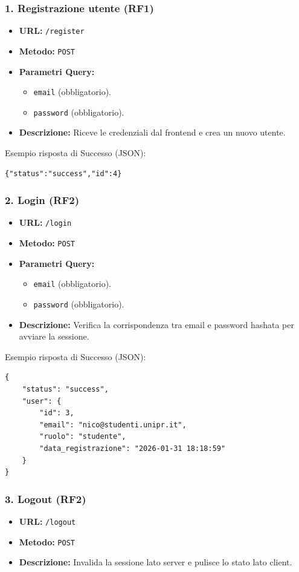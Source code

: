 \subsubsection{1. Registrazione utente (RF1)}
\begin{itemize}
    \item \textbf{URL:} \texttt{/register}
    \item \textbf{Metodo:} \texttt{POST}    
    \item \textbf{Parametri Query:} 
        \begin{itemize}
            \item \texttt{email} (obbligatorio).
            \item \texttt{password} (obbligatorio).
        \end{itemize}
    \item \textbf{Descrizione:} Riceve le credenziali dal frontend e crea un nuovo utente.
\end{itemize}
Esempio risposta di Successo (JSON):
\begin{verbatim}
{"status":"success","id":4}
\end{verbatim}

\subsubsection{2. Login (RF2)}
\begin{itemize}
    \item \textbf{URL:} \texttt{/login}
    \item \textbf{Metodo:} \texttt{POST}
    \item \textbf{Parametri Query:} 
        \begin{itemize}
            \item \texttt{email} (obbligatorio).
            \item \texttt{password} (obbligatorio).
        \end{itemize}
    \item \textbf{Descrizione:} Verifica la corrispondenza tra email e password hashata per avviare la sessione.
\end{itemize}
Esempio risposta di Successo (JSON):
\begin{verbatim}
{
    "status": "success",
    "user": {
        "id": 3,
        "email": "nico@studenti.unipr.it",
        "ruolo": "studente",
        "data_registrazione": "2026-01-31 18:18:59"
    }
}
\end{verbatim}

\subsubsection{3. Logout (RF2)}
\begin{itemize}
    \item \textbf{URL:} \texttt{/logout}
    \item \textbf{Metodo:} \texttt{POST}
    \item \textbf{Descrizione:} Invalida la sessione lato server e pulisce lo stato lato client.
\end{itemize}

